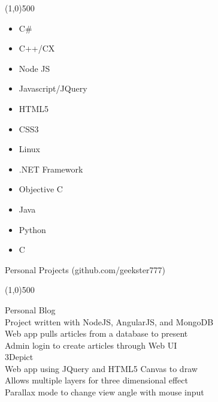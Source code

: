 \documentclass{article}
\begin{document}
\begin{center}
  \line(1,0){500}
\end{center}
\begin{minipage}[t]{0.33\textwidth}
  \begin {itemize}
    \item C\# 
    \item C++/CX 
    \item Node JS 
    \item Javascript/JQuery 
  \end{itemize}
\end{minipage}
\begin{minipage}[t]{0.33\textwidth}
  \begin {itemize}
    \item HTML5 
    \item CSS3 
    \item Linux
    \item .NET Framework 
  \end{itemize}
\end{minipage}
\begin{minipage}[t]{0.34\textwidth}
  \begin {itemize}
    \item Objective C 
    \item Java 
    \item Python 
    \item C 
  \end{itemize}
\end{minipage}
{\Large Personal Projects (github.com/geekster777) } \\ 
\begin{center}
  \line(1,0){500}
\end{center}
\begin{minipage}[t]{0.5\textwidth}
  {\large Personal Blog } \\
  Project written with NodeJS, AngularJS, and MongoDB \\
  Web app pulls articles from a database to present \\
  Admin login to create articles through Web UI \\
  {\large 3Depict } \\
  Web app using JQuery and HTML5 Canvas to draw \\
  Allows multiple layers for three dimensional effect \\
  Parallax mode to change view angle with mouse input \\
\end{minipage}
\end{document}
